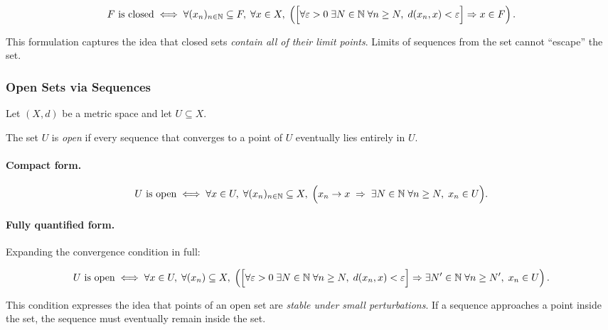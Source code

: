\[
F \text{ is closed}
\iff
\forall (x_n)_{n\in\mathbb{N}} \subseteq F,\;
\forall x \in X,\;
\left(
  \Bigl[
    \forall \varepsilon>0\;
    \exists N\in\mathbb{N}\;
    \forall n\ge N,\;
    d(x_n,x)<\varepsilon
  \Bigr]
  \Rightarrow
  x\in F
\right).
\]

\begin{remark}
This formulation captures the idea that closed sets
\emph{contain all of their limit points}.
Limits of sequences from the set cannot ``escape'' the set.
\end{remark}

\subsubsection{Open Sets via Sequences}

\begin{definition}
\label{def:open-sequential}
Let $(X,d)$ be a metric space and let $U \subseteq X$.

The set $U$ is \emph{open} if every sequence that converges
to a point of $U$ eventually lies entirely in $U$.
\end{definition}

\paragraph{Compact form.}

\[
U \text{ is open}
\iff
\forall x\in U,\;
\forall (x_n)_{n\in\mathbb{N}} \subseteq X,\;
\Bigl(
  x_n \to x
  \;\Rightarrow\;
  \exists N\in\mathbb{N}\;
  \forall n\ge N,\;
  x_n\in U
\Bigr).
\]

\paragraph{Fully quantified form.}

Expanding the convergence condition in full:

\[
U \text{ is open}
\iff
\forall x\in U,\;
\forall (x_n)\subseteq X,\;
\left(
  \Bigl[
    \forall \varepsilon>0\;
    \exists N\in\mathbb{N}\;
    \forall n\ge N,\;
    d(x_n,x)<\varepsilon
  \Bigr]
  \Rightarrow
  \exists N'\in\mathbb{N}\;
  \forall n\ge N',\;
  x_n\in U
\right).
\]

\begin{remark}
This condition expresses the idea that points of an open set
are \emph{stable under small perturbations}.
If a sequence approaches a point inside the set, the sequence
must eventually remain inside the set.
\end{remark}

